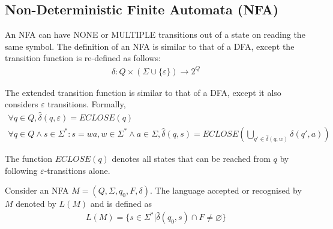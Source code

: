 \documentclass[a4paper]{article}
\theoremstyle{plain}
\theoremstyle{definition}
\newtheorem{defn}{Definition}[section]
\theoremstyle{remark}
\begin{document}
\subsection{Non-Deterministic Finite Automata (NFA)}
\begin{tcolorbox}[colback=black!3!white,colframe=black!60!white,title=\begin{defn}NFA \label{NFA}\end{defn}]
An NFA can have NONE or MULTIPLE transitions out of a state on reading the same symbol. The definition of an NFA is similar to that of a DFA, except the transition function is re-defined as follows:
\begin{align}
\delta : Q \times \left( \Sigma \cup \{\varepsilon\} \right) \to 2^{Q}
\end{align}
\end{tcolorbox}
\begin{tcolorbox}[colback=black!3!white,colframe=black!60!white,title=\begin{defn}Extended Transition Function \label{Extended Transition Function}\end{defn}]
The extended transition function is similar to that of a DFA, except it also considers $\varepsilon$ transitions. Formally,
\begin{align}
	\forall q \in Q, \hat{\delta}(q,\varepsilon) = ECLOSE(q) \\
\forall q \in Q \land s \in \Sigma^{*} : s=wa, w \in \Sigma^{*} \land a \in \Sigma, \hat{\delta}(q,s) = ECLOSE\left(\bigcup_{q'\in \hat{\delta}(q,w)}\delta(q',a)\right)
\end{align}
\end{tcolorbox}
\begin{tcolorbox}[colback=black!3!white,colframe=black!60!white,title=\begin{defn}E-closure \label{E-closure}\end{defn}]
The function $ECLOSE(q)$ denotes all states that can be reached from $q$ by following $\varepsilon$-transitions alone.
\end{tcolorbox}
\begin{tcolorbox}[colback=black!3!white,colframe=black!60!white,title=\begin{defn}Language \label{Language}\end{defn}]
Consider an NFA $M=(Q,\Sigma,q_0,F,\delta)$. The language accepted or recognised by $M$ denoted by $L(M)$ and is defined as
\begin{align}
	L(M) = \{s \in \Sigma^{*} | \hat{\delta}(q_0,s) \cap F \neq \varnothing \}
\end{align}
\end{tcolorbox}
\end{document}

